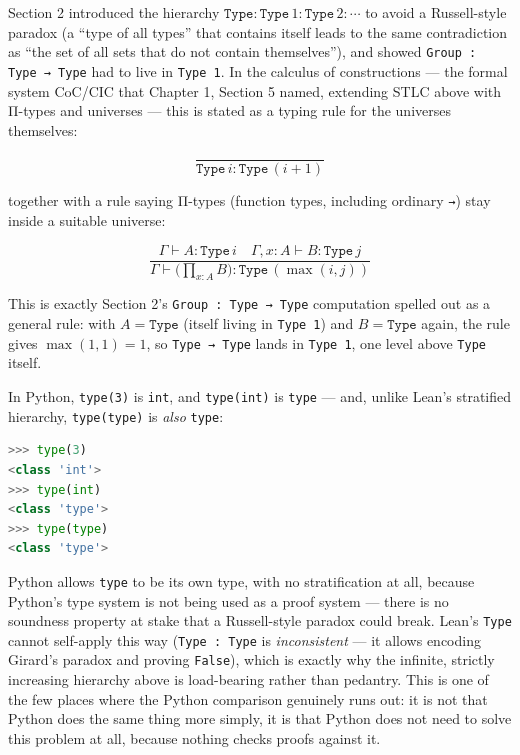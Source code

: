 Section 2 introduced the hierarchy \(\mathtt{Type} : \mathtt{Type}\,1 :
\mathtt{Type}\,2 : \cdots\) to avoid a Russell-style paradox (a ``type of all types'' that contains itself leads to the same contradiction as ``the set of all sets that do not contain themselves''), and showed \texttt{Group : Type → Type} had to live in \texttt{Type 1}. In the calculus of constructions --- the formal system CoC/CIC that Chapter 1, Section 5 named, extending STLC above with Π-types and universes --- this is stated as a typing rule for the universes themselves:

\[
\dfrac{}{\mathtt{Type}\,i : \mathtt{Type}\,(i+1)}
\]

together with a rule saying Π-types (function types, including ordinary \texttt{→}) stay inside a suitable universe:

\[
\dfrac{\Gamma \vdash A : \mathtt{Type}\,i \quad \Gamma, x:A \vdash B : \mathtt{Type}\,j}
      {\Gamma \vdash \big(\textstyle\prod_{x:A} B\big) : \mathtt{Type}\,(\max(i,j))}
\]

This is exactly Section 2's \texttt{Group : Type → Type} computation spelled out as a general rule: with \(A = \mathtt{Type}\) (itself living in \texttt{Type 1}) and \(B = \mathtt{Type}\) again, the rule gives \(\max(1, 1) = 1\), so \texttt{Type → Type} lands in \texttt{Type 1}, one level above \texttt{Type} itself.

\begin{progcorner}

In Python, \texttt{type(3)} is \texttt{int}, and \texttt{type(int)} is \texttt{type} --- and, unlike Lean's stratified hierarchy, \texttt{type(type)} is \emph{also} \texttt{type}:

\end{progcorner}

\begin{lstlisting}[language=Python,style=python]
>>> type(3)
<class 'int'>
>>> type(int)
<class 'type'>
>>> type(type)
<class 'type'>
\end{lstlisting}

Python allows \texttt{type} to be its own type, with no stratification at all, because Python's type system is not being used as a proof system --- there is no soundness property at stake that a Russell-style paradox could break. Lean's \texttt{Type} cannot self-apply this way (\texttt{Type : Type} is \emph{inconsistent} --- it allows encoding Girard's paradox and proving \texttt{False}), which is exactly why the infinite, strictly increasing hierarchy above is load-bearing rather than pedantry. This is one of the few places where the Python comparison genuinely runs out: it is not that Python does the same thing more simply, it is that Python does not need to solve this problem at all, because nothing checks proofs against it.

